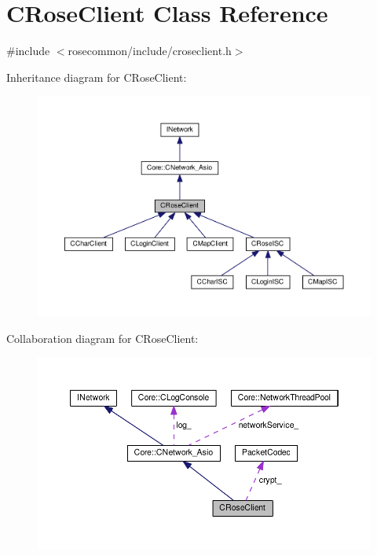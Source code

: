 \hypertarget{classCRoseClient}{}\section{C\+Rose\+Client Class Reference}
\label{classCRoseClient}


{\ttfamily \#include $<$rosecommon/include/croseclient.\+h$>$}



Inheritance diagram for C\+Rose\+Client\+:
\nopagebreak
\begin{figure}[H]
\begin{center}
\leavevmode
\includegraphics[width=350pt]{classCRoseClient__inherit__graph}
\end{center}
\end{figure}


Collaboration diagram for C\+Rose\+Client\+:
\nopagebreak
\begin{figure}[H]
\begin{center}
\leavevmode
\includegraphics[width=350pt]{classCRoseClient__coll__graph}
\end{center}
\end{figure}
